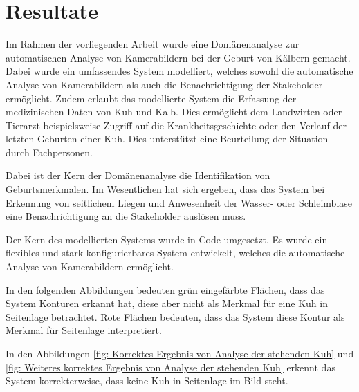 

\chapter{Resultate}


Im Rahmen der vorliegenden Arbeit wurde eine Domänenanalyse zur automatischen Analyse von Kamerabildern bei der Geburt von Kälbern gemacht. Dabei wurde ein umfassendes System modelliert, welches sowohl die automatische Analyse von Kamerabildern als auch die Benachrichtigung der Stakeholder ermöglicht. Zudem erlaubt das modellierte System die Erfassung der medizinischen Daten von Kuh und Kalb. Dies ermöglicht dem Landwirten oder Tierarzt beispielsweise Zugriff auf die Krankheitsgeschichte oder den Verlauf der letzten Geburten einer Kuh. Dies unterstützt eine Beurteilung der Situation durch Fachpersonen. 

Dabei ist der Kern der Domänenanalyse die Identifikation von Geburtsmerkmalen. Im Wesentlichen hat sich ergeben, dass das System bei Erkennung von seitlichem Liegen und Anwesenheit der Wasser- oder Schleimblase eine Benachrichtigung an die Stakeholder auslösen muss. 

Der Kern des modellierten Systems wurde in Code umgesetzt. Es wurde ein flexibles und stark konfigurierbares System entwickelt, welches die automatische Analyse von Kamerabildern ermöglicht.

In den folgenden Abbildungen bedeuten grün eingefärbte Flächen, dass das System Konturen erkannt hat, diese aber nicht als Merkmal für eine Kuh in Seitenlage betrachtet. Rote Flächen bedeuten, dass das System diese Kontur als Merkmal für Seitenlage interpretiert.

In den Abbildungen \ref{fig: Korrektes Ergebnis von Analyse der stehenden Kuh} und \ref{fig: Weiteres korrektes Ergebnis von Analyse der stehenden Kuh} erkennt das System korrekterweise, dass keine Kuh in Seitenlage im Bild steht.

